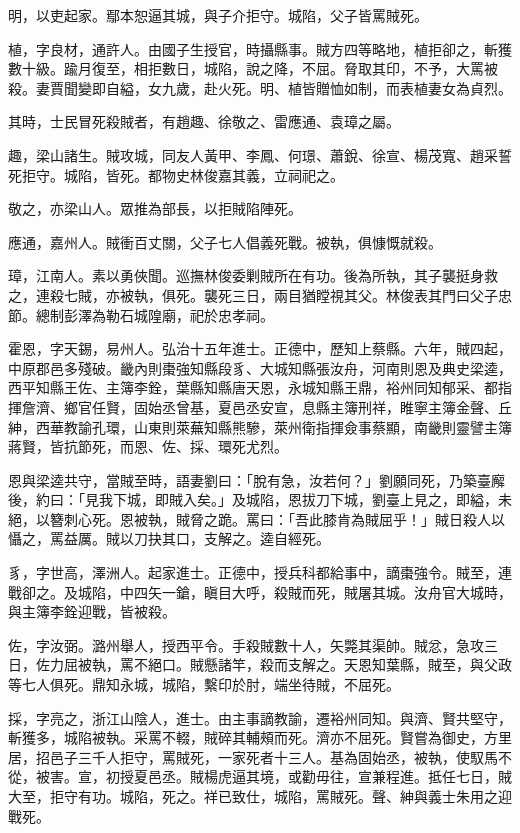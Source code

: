 \begin{pinyinscope}
明，以吏起家。鄢本恕逼其城，與子介拒守。城陷，父子皆罵賊死。

植，字良材，通許人。由國子生授官，時攝縣事。賊方四等略地，植拒卻之，斬獲數十級。踰月復至，相拒數日，城陷，說之降，不屈。脅取其印，不予，大罵被殺。妻賈聞變即自縊，女九歲，赴火死。明、植皆贈恤如制，而表植妻女為貞烈。

其時，士民冒死殺賊者，有趙趣、徐敬之、雷應通、袁璋之屬。

趣，梁山諸生。賊攻城，同友人黃甲、李鳳、何璟、蕭銳、徐宣、楊茂寬、趙采誓死拒守。城陷，皆死。都物史林俊嘉其義，立祠祀之。

敬之，亦梁山人。眾推為部長，以拒賊陷陣死。

應通，嘉州人。賊衝百丈關，父子七人倡義死戰。被執，俱慷慨就殺。

璋，江南人。素以勇俠聞。巡撫林俊委剿賊所在有功。後為所執，其子襲挺身救之，連殺七賊，亦被執，俱死。襲死三日，兩目猶瞠視其父。林俊表其門曰父子忠節。總制彭澤為勒石城隍廟，祀於忠孝祠。

霍恩，字天錫，易州人。弘治十五年進士。正德中，歷知上蔡縣。六年，賊四起，中原郡邑多殘破。畿內則棗強知縣段豸、大城知縣張汝舟，河南則恩及典史梁逵，西平知縣王佐、主簿李銓，葉縣知縣唐天恩，永城知縣王鼎，裕州同知郁采、都指揮詹濟、鄉官任賢，固始丞曾基，夏邑丞安宣，息縣主簿刑祥，睢寧主簿金聲、丘紳，西華教諭孔環，山東則萊蕪知縣熊驂，萊州衛指揮僉事蔡顯，南畿則靈譬主簿蔣賢，皆抗節死，而恩、佐、採、環死尤烈。

恩與梁逵共守，當賊至時，語妻劉曰：「脫有急，汝若何？」劉願同死，乃築臺廨後，約曰：「見我下城，即賊入矣。」及城陷，恩拔刀下城，劉臺上見之，即縊，未絕，以簪刺心死。恩被執，賊脅之跪。罵曰：「吾此膝肯為賊屈乎！」賊日殺人以懾之，罵益厲。賊以刀抉其口，支解之。逵自經死。

豸，字世高，澤洲人。起家進士。正德中，授兵科都給事中，謫棗強令。賊至，連戰卻之。及城陷，中四矢一鎗，瞋目大呼，殺賊而死，賊屠其城。汝舟官大城時，與主簿李銓迎戰，皆被殺。

佐，字汝弼。潞州舉人，授西平令。手殺賊數十人，矢斃其渠帥。賊忿，急攻三日，佐力屈被執，罵不絕口。賊懸諸竿，殺而支解之。天恩知葉縣，賊至，與父政等七人俱死。鼎知永城，城陷，繫印於肘，端坐待賊，不屈死。

採，字亮之，浙江山陰人，進士。由主事謫教諭，遷裕州同知。與濟、賢共堅守，斬獲多，城陷被執。采罵不輟，賊碎其輔頰而死。濟亦不屈死。賢嘗為御史，方里居，招邑子三千人拒守，罵賊死，一家死者十三人。基為固始丞，被執，使馭馬不從，被害。宣，初授夏邑丞。賊楊虎逼其境，或勸毋往，宣兼程進。抵任七日，賊大至，拒守有功。城陷，死之。祥已致仕，城陷，罵賊死。聲、紳與義士朱用之迎戰死。


\end{pinyinscope}
